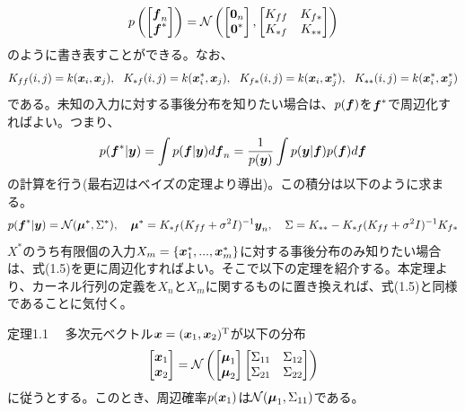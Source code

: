 \documentclass[dvipdfmx, 9pt, a4paper]{jsarticle}
\numberwithin{equation}{section}
\newcommand{\bm}[1]{{\mbox{\boldmath $#1$}}}
\begin{document}
\begin{equation}
p\left(
\begin{bmatrix}
\bm f_n \\ \bm f^*
\end{bmatrix}
\right)=\mathcal{N}\left(
\begin{bmatrix}
\bm 0_n \\ \bm 0^*
\end{bmatrix},
\begin{bmatrix}
K_{ff} & K_{f*} \\
K_{*f} & K_{**} \\
\end{bmatrix}\right) \notag
\end{equation}
のように書き表すことができる。なお、
\begin{equation}
K_{ff}(i, j) = k(\bm x_i, \bm x_j),~~K_{*f}(i, j) = k(\bm x^*_i, \bm x_j),~~K_{f*}(i, j) = k(\bm x_i, \bm x^*_j),~~K_{**}(i, j) = k(\bm x^*_i, \bm x^*_j) \notag
\end{equation}
である。未知の入力に対する事後分布を知りたい場合は、$p(\bm f)$を$\bm f^*$で周辺化すればよい。つまり、
\begin{equation}
p(\bm f^*|\bm y)=\int p(\bm f|\bm y)d\bm f_n=\frac{1}{p(\bm y)}\int p(\bm y|\bm f)p(\bm f)d\bm f \notag
\end{equation}
の計算を行う(最右辺はベイズの定理より導出)。この積分は以下のように求まる。
\begin{equation}
p(\bm f^*|\bm y)=\mathcal{N}(\bm \mu^*, \Sigma^*),~~~\bm \mu^*=K_{*f}(K_{ff}+\sigma^2I)^{-1}\bm y_n,~~~\Sigma=K_{**}-K_{*f}(K_{ff}+\sigma^2I)^{-1}K_{f*}
\end{equation}
$X^*$のうち有限個の入力$X_m=\{\bm x^*_1, ..., \bm x^*_m\}$に対する事後分布のみ知りたい場合は、式(1.5)を更に周辺化すればよい。そこで以下の定理を紹介する。本定理より、カーネル行列の定義を$X_n$と$X_m$に関するものに置き換えれば、式(1.5)と同様であることに気付く。
\begin{itembox}[l]{定理1.1}
　多次元ベクトル$\bm x = (\bm x_1, \bm x_2)^{\rm T}$が以下の分布
\begin{equation}
\begin{bmatrix}
\bm x_1 \\ \bm x_2
\end{bmatrix}=
\mathcal{N}\left(
\begin{bmatrix}
\bm \mu_1 \\ \bm \mu_2
\end{bmatrix}
\begin{bmatrix}
\Sigma_{11} & \Sigma_{12} \\
\Sigma_{21} & \Sigma_{22}
\end{bmatrix}
\right) \notag
\end{equation}
に従うとする。このとき、周辺確率$p(\bm x_1)$は$\mathcal{N}(\bm \mu_1, \Sigma_{11})$である。
\end{itembox}\par
\end{document}
